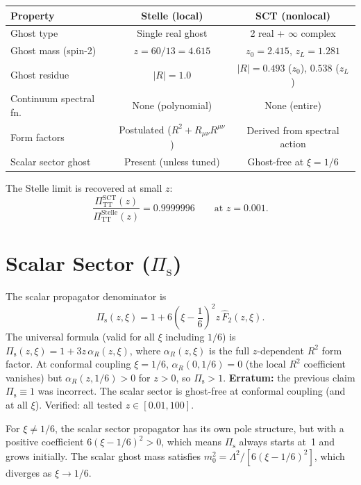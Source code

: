 \documentclass[11pt,a4paper]{article}
\newcommand{\Rsq}{R^2}
\newcommand{\PiTT}{\Pi_{\mathrm{TT}}}
\newcommand{\Pis}{\Pi_{\mathrm{s}}}
\newcommand{\Fhat}{\hat{F}}
\begin{document}
\begin{center}
\begin{tabular}{lcc}
\toprule
Property & Stelle (local) & SCT (nonlocal) \\
\midrule
Ghost type & Single real ghost & 2 real + $\infty$ complex \\
Ghost mass (spin-2) & $z = 60/13 = 4.615$ & $z_0 = 2.415$, $z_L = 1.281$ \\
Ghost residue & $|R| = 1.0$ & $|R| = 0.493$ ($z_0$), $0.538$ ($z_L$) \\
Continuum spectral fn.\ & None (polynomial) & None (entire) \\
Form factors & Postulated ($\Rsq + R_{\mu\nu}R^{\mu\nu}$) & Derived from spectral action \\
Scalar sector ghost & Present (unless tuned) & Ghost-free at $\xi = 1/6$ \\
\bottomrule
\end{tabular}
\end{center}

The Stelle limit is recovered at small $z$:
\begin{equation}
  \frac{\PiTT^{\mathrm{SCT}}(z)}{\PiTT^{\mathrm{Stelle}}(z)}
  = 0.9999996
  \qquad \text{at } z = 0.001.
\end{equation}


\section{Scalar Sector ($\Pis$)}
\label{sec:scalar}

The scalar propagator denominator is
\begin{equation}
  \Pis(z,\xi) = 1 + 6\!\left(\xi - \frac{1}{6}\right)^{\!2} z\,\Fhat_2(z,\xi).
\end{equation}
The universal formula (valid for all $\xi$ including $1/6$) is
$\Pis(z,\xi) = 1 + 3z\,\alpha_R(z,\xi)$, where $\alpha_R(z,\xi)$ is the
full $z$-dependent $R^2$ form factor. At conformal coupling $\xi = 1/6$,
$\alpha_R(0, 1/6) = 0$ (the local $R^2$ coefficient vanishes) but
$\alpha_R(z, 1/6) > 0$ for $z > 0$, so $\Pis > 1$.
\textbf{Erratum:} the previous claim $\Pis \equiv 1$ was incorrect.
The scalar sector is ghost-free at conformal coupling (and at all $\xi$). Verified:
all tested $z \in [0.01, 100]$.

For $\xi \neq 1/6$, the scalar sector propagator has its own pole
structure, but with a positive coefficient $6(\xi - 1/6)^2 > 0$, which
means $\Pis$ always starts at~1 and grows initially.  The scalar ghost
mass satisfies $m_0^2 = \Lambda^2/[6(\xi - 1/6)^2]$, which diverges as
$\xi \to 1/6$.
\end{document}
